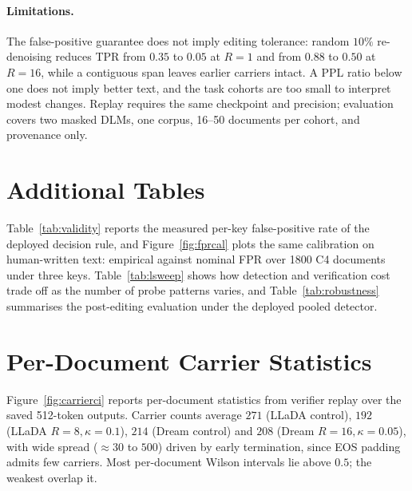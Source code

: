 \documentclass{article}
\theoremstyle{definition}
\begin{document}
\paragraph{Limitations.}
The false-positive guarantee does not imply editing tolerance: random $10\%$ re-denoising reduces
TPR from $0.35$ to $0.05$ at $R=1$ and from $0.88$ to $0.50$ at $R=16$, while a contiguous span
leaves earlier carriers intact. A PPL ratio below one does not imply better text, and the task
cohorts are too small to interpret modest changes. Replay requires the same checkpoint and
precision; evaluation covers two masked DLMs, one corpus, 16--50 documents per cohort, and
provenance only.

\clearpage



\clearpage
\appendix
\section{Additional Tables}
\label{app:tables}

Table~\ref{tab:validity} reports the measured per-key false-positive rate of the deployed
decision rule, and Figure~\ref{fig:fprcal} plots the same calibration on human-written text:
empirical against nominal FPR over 1800 C4 documents under three keys.
Table~\ref{tab:lsweep} shows how detection and verification cost trade off as the number of
probe patterns varies, and Table~\ref{tab:robustness} summarises the post-editing evaluation
under the deployed pooled detector.






\section{Per-Document Carrier Statistics}
\label{app:carriers}

Figure~\ref{fig:carrierci} reports per-document statistics from verifier replay over the saved
512-token outputs. Carrier counts average $271$ (LLaDA control), $192$ (LLaDA
$R{=}8,\kappa{=}0.1$), $214$ (Dream control) and $208$ (Dream $R{=}16,\kappa{=}0.05$), with
wide spread ($\approx 30$ to $500$) driven by early termination, since EOS padding admits
few carriers. Most per-document Wilson intervals lie above $0.5$; the weakest overlap it.


\end{document}
